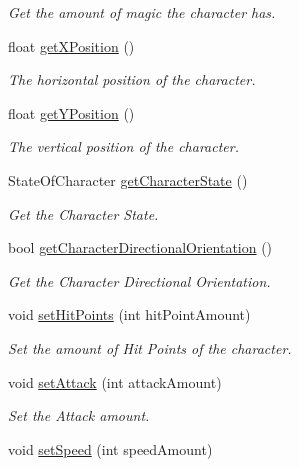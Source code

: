 \begin{DoxyCompactItemize}
\begin{DoxyCompactList}\small\item\em Get the amount of magic the character has. \end{DoxyCompactList}\item 
float \mbox{\hyperlink{classCharacterStats_afb86511575622311cfe30efeff513e6f}{get\+X\+Position}} ()
\begin{DoxyCompactList}\small\item\em The horizontal position of the character. \end{DoxyCompactList}\item 
float \mbox{\hyperlink{classCharacterStats_ac8669b2ea74ea7a712463f9f2e0d05c8}{get\+Y\+Position}} ()
\begin{DoxyCompactList}\small\item\em The vertical position of the character. \end{DoxyCompactList}\item 
State\+Of\+Character \mbox{\hyperlink{classCharacterStats_aaae019fd87e05cc2f98b440a868dcf41}{get\+Character\+State}} ()
\begin{DoxyCompactList}\small\item\em Get the Character State. \end{DoxyCompactList}\item 
bool \mbox{\hyperlink{classCharacterStats_ad5fedea8c417b2ddcb6b72c8ce6a06ac}{get\+Character\+Directional\+Orientation}} ()
\begin{DoxyCompactList}\small\item\em Get the Character Directional Orientation. \end{DoxyCompactList}\item 
void \mbox{\hyperlink{classCharacterStats_a7359c58479aebab283da03a0503cedf0}{set\+Hit\+Points}} (int hit\+Point\+Amount)
\begin{DoxyCompactList}\small\item\em Set the amount of Hit Points of the character. \end{DoxyCompactList}\item 
void \mbox{\hyperlink{classCharacterStats_a67bfa42fdaecd66ad03786a44e45874c}{set\+Attack}} (int attack\+Amount)
\begin{DoxyCompactList}\small\item\em Set the Attack amount. \end{DoxyCompactList}\item 
void \mbox{\hyperlink{classCharacterStats_a12f04dfcc06dae1bc1b0ae03babd28b6}{set\+Speed}} (int speed\+Amount)

\end{DoxyCompactItemize}
